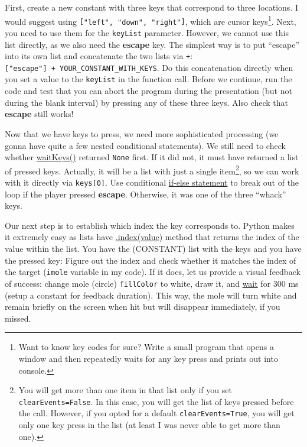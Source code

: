 \documentclass[
]{book}
\begin{document}
First, create a new constant with three keys that correspond to three locations. I would suggest using \texttt{{[}"left",\ "down",\ "right"{]}}, which are cursor keys\footnote{Want to know key codes for sure? Write a small program that opens a window and then repeatedly waits for any key press and prints out into console.}. Next, you need to use them for the \texttt{keyList} parameter. However, we cannot use this list directly, as we also need the \textbf{escape} key. The simplest way is to put ``escape'' into its own list and concatenate the two lists via \texttt{+}: \texttt{{[}"escape"{]}\ +\ YOUR\_CONSTANT\_WITH\_KEYS}. Do this concatenation directly when you set a value to the \texttt{keyList} in the function call. Before we continue, run the code and test that you can abort the program during the presentation (but not during the blank interval) by pressing any of these three keys. Also check that \textbf{escape} still works!

Now that we have keys to press, we need more sophisticated processing (we gonna have quite a few nested conditional statements). We still need to check whether \href{https://psychopy.org/api/event.html\#psychopy.event.waitKeys}{waitKeys()} returned \texttt{None} first. If it did not, it must have returned a list of pressed keys. Actually, it will be a list with just a single item\footnote{You will get more than one item in that list only if you set \texttt{clearEvents=False}. In this case, you will get the list of keys pressed before the call. However, if you opted for a default \texttt{clearEvents=True}, you will get only one key press in the list (at least I was never able to get more than one).}, so we can work with it directly via \texttt{keys{[}0{]}}. Use conditional \protect\hyperlink{if-statement}{if-else statement} to break out of the loop if the player pressed \textbf{escape}. Otherwise, it was one of the three ``whack'' keys.

Our next step is to establish which index the key corresponds to. Python makes it extremely easy as lists have \href{https://docs.python.org/3/tutorial/datastructures.html\#more-on-lists}{.index(value)} method that returns the index of the value within the list. You have the (CONSTANT) list with the keys and you have the pressed key: Figure out the index and check whether it matches the index of the target (\texttt{imole} variable in my code). If it does, let us provide a visual feedback of success: change mole (circle) \texttt{fillColor} to white, draw it, and \href{https://psychopy.org/api/clock.html\#psychopy.clock.wait}{wait} for 300 ms (setup a constant for feedback duration). This way, the mole will turn white and remain briefly on the screen when hit but will disappear immediately, if you missed.
\end{document}
